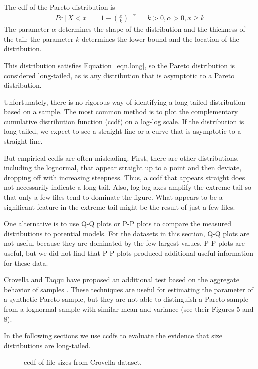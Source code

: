 \documentclass[10pt,twocolumn]{article}
\begin{document}

The cdf of the Pareto distribution is
%
\begin{eqnarray}
Pr[X < x] = 1 - \left( \frac{x}{k} \right)^{-\alpha} & & 
k>0, \alpha>0, x \ge k
\end{eqnarray}
%
The parameter $\alpha$
determines the shape of the distribution and the thickness of
the tail; the parameter $k$
determines the lower bound and the location of the distribution.

This distribution satisfies Equation~\ref{eqn.long}, so the Pareto
distribution is considered long-tailed, as is any distribution that is
asymptotic to a Pareto distribution.

Unfortunately, there is no rigorous way of identifying a long-tailed
distribution based on a sample.  The most common method is to plot the
complementary cumulative distribution function (ccdf) on a log-log
scale.  If the distribution is long-tailed, we expect to see a
straight line or a curve that is asymptotic to a straight line.

But empirical ccdfs are often misleading.  First, there are
other distributions, including the lognormal, that appear straight up
to a point and then deviate, dropping off with increasing steepness.
Thus, a ccdf that appears straight does not necessarily
indicate a long tail.  Also, log-log axes amplify the extreme tail so
that only a few files tend to dominate the figure.  What appears to be
a significant feature in the extreme tail might be the result of
just a few files.

One alternative is to use Q-Q plots or P-P plots to compare the
measured distributions to potential models.  For the datasets in this
section, Q-Q plots are not useful because they are dominated by the
few largest values.  P-P plots are useful, but we did not find that
P-P plots produced additional useful information for these data.

Crovella and Taqqu have proposed an additional test based on the
aggregate behavior of samples \cite{CrovellaTaqqu99}.  These
techniques are useful for estimating the parameter of a synthetic
Pareto sample, but they are not able to distinguish a Pareto sample
from a lognormal sample with similar mean and variance (see their
Figures 5 and 8).

In the following sections we use ccdfs to evaluate
the evidence that size distributions are long-tailed.

\begin{figure}[tb]
\centerline{}
\caption{
ccdf of file sizes from Crovella dataset.}
\label{fig.crovella}
\end{figure}
\end{document}
